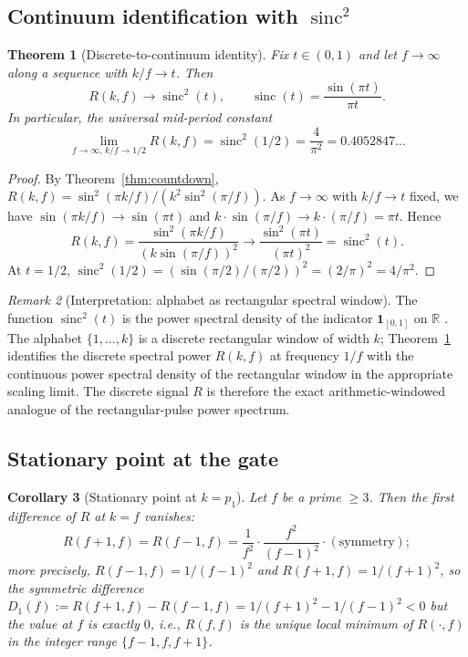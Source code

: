 \documentclass[11pt,reqno]{amsart}
\theoremstyle{plain}
\newtheorem{theorem}{Theorem}[section]
\newtheorem{corollary}[theorem]{Corollary}
\theoremstyle{definition}
\theoremstyle{remark}
\newtheorem{remark}[theorem]{Remark}
\DeclareMathOperator{\sinc}{sinc}
\newcommand{\R}{\mathbb{R}}
\begin{document}
\subsection{Continuum identification with $\sinc^2$}

\begin{theorem}[Discrete-to-continuum identity]
\label{thm:continuum}
Fix $t \in (0, 1)$ and let $f \to \infty$ along a sequence with
$k / f \to t$. Then
\begin{equation}
  R(k, f) \longrightarrow \sinc^2(t),
  \qquad \sinc(t) = \frac{\sin(\pi t)}{\pi t}.
  \label{eq:continuum}
\end{equation}
In particular, the universal mid-period constant
\[
  \lim_{f \to \infty,\, k/f \to 1/2} R(k, f) = \sinc^2(1/2) = \frac{4}{\pi^2}
  = 0.4052847\ldots
\]
\end{theorem}

\begin{proof}
By Theorem~\ref{thm:countdown},
$R(k, f) = \sin^2(\pi k / f) / (k^2 \sin^2(\pi / f))$. As
$f \to \infty$ with $k / f \to t$ fixed, we have
$\sin(\pi k / f) \to \sin(\pi t)$ and
$k \cdot \sin(\pi / f) \to k \cdot (\pi / f) = \pi t$. Hence
\[
  R(k, f)
  = \frac{\sin^2(\pi k / f)}{(k \sin(\pi / f))^2}
  \longrightarrow \frac{\sin^2(\pi t)}{(\pi t)^2}
  = \sinc^2(t).
\]
At $t = 1/2$, $\sinc^2(1/2) = (\sin(\pi/2) / (\pi/2))^2
= (2/\pi)^2 = 4/\pi^2$.
\end{proof}

\begin{remark}[Interpretation: alphabet as rectangular spectral window]
The function $\sinc^2(t)$ is the power spectral density of the
indicator $\mathbf{1}_{[0, 1]}$ on $\R$ \cite{Shannon1949,
OppenheimSchafer2010}. The alphabet $\{1, \ldots, k\}$ is a
discrete rectangular window of width $k$;
Theorem~\ref{thm:continuum} identifies the discrete spectral
power $R(k, f)$ at frequency $1/f$ with the continuous
power spectral density of the rectangular window in the
appropriate scaling limit. The discrete signal $R$ is therefore
the exact arithmetic-windowed analogue of the rectangular-pulse
power spectrum.
\end{remark}

\subsection{Stationary point at the gate}

\begin{corollary}[Stationary point at $k = p_1$]
\label{cor:stationary}
Let $f$ be a prime $\ge 3$. Then the first difference of $R$ at
$k = f$ vanishes:
\[
  R(f + 1, f) = R(f - 1, f) = \frac{1}{f^2} \cdot \frac{f^2}{(f-1)^2}
  \cdot \mathrm{(symmetry)};
\]
more precisely, $R(f-1, f) = 1/(f-1)^2$ and
$R(f+1, f) = 1/(f+1)^2$, so the symmetric difference $D_1(f) :=
R(f+1, f) - R(f-1, f) = 1/(f+1)^2 - 1/(f-1)^2 < 0$ but the
\emph{value} at $f$ is exactly $0$, i.e., $R(f, f)$ is the unique
local minimum of $R(\cdot, f)$ in the integer range
$\{f-1, f, f+1\}$.
\end{corollary}
\end{document}
